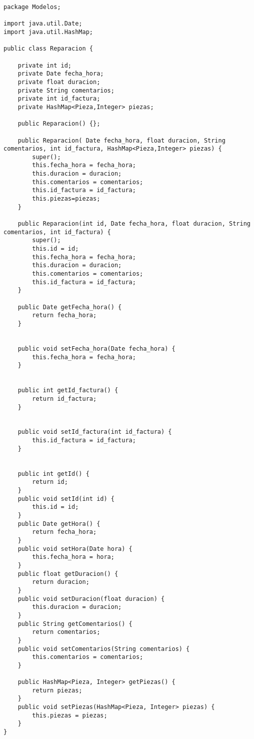 \begin{lstlisting}[caption=Reparacion.java (App Escritorio)]
package Modelos;

import java.util.Date;
import java.util.HashMap;

public class Reparacion {
	
	private int id;
	private Date fecha_hora;
	private float duracion;
	private String comentarios;
	private int id_factura;
	private	HashMap<Pieza,Integer> piezas;
	
	public Reparacion() {};
	
	public Reparacion( Date fecha_hora, float duracion, String comentarios, int id_factura, HashMap<Pieza,Integer> piezas) {
		super();
		this.fecha_hora = fecha_hora;
		this.duracion = duracion;
		this.comentarios = comentarios;
		this.id_factura = id_factura;
		this.piezas=piezas;
	}

	public Reparacion(int id, Date fecha_hora, float duracion, String comentarios, int id_factura) {
		super();
		this.id = id;
		this.fecha_hora = fecha_hora;
		this.duracion = duracion;
		this.comentarios = comentarios;
		this.id_factura = id_factura;
	}
	
	public Date getFecha_hora() {
		return fecha_hora;
	}


	public void setFecha_hora(Date fecha_hora) {
		this.fecha_hora = fecha_hora;
	}


	public int getId_factura() {
		return id_factura;
	}


	public void setId_factura(int id_factura) {
		this.id_factura = id_factura;
	}


	public int getId() {
		return id;
	}
	public void setId(int id) {
		this.id = id;
	}
	public Date getHora() {
		return fecha_hora;
	}
	public void setHora(Date hora) {
		this.fecha_hora = hora;
	}
	public float getDuracion() {
		return duracion;
	}
	public void setDuracion(float duracion) {
		this.duracion = duracion;
	}
	public String getComentarios() {
		return comentarios;
	}
	public void setComentarios(String comentarios) {
		this.comentarios = comentarios;
	}

	public HashMap<Pieza, Integer> getPiezas() {
		return piezas;
	}
	public void setPiezas(HashMap<Pieza, Integer> piezas) {
		this.piezas = piezas;
	}	
}
\end{lstlisting}

\clearpage


